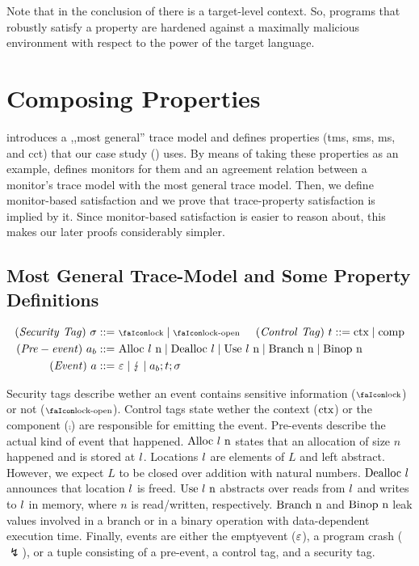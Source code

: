 \documentclass[acmsmall,review,screen,dvipsnames]{acmart}
\begin{document}
Note that in the conclusion of  there is a target-level context.
So, programs that robustly satisfy a property are hardened against a maximally malicious environment with respect to the power of the target language.

\section{Composing Properties}\label{sec:compprop}
 introduces a ,,most general'' trace model and defines properties (\gls{tms}, \gls{sms}, \gls{ms}, and \gls{cct}) that our case study () uses.
By means of taking these properties as an example,  defines monitors for them and an agreement relation between a monitor's trace model with the most general trace model.
Then, we define monitor-based satisfaction and we prove that trace-property satisfaction is implied by it.
Since monitor-based satisfaction is easier to reason about, this makes our later proofs considerably simpler.

\subsection{Most General Trace-Model and Some Property Definitions}\label{subsec:propdefs}

\begin{gather*}
  \begin{aligned}
  \mi{(Security\ Tag)}~\sigma\bnfdef&\ \lock \mid \unlock\hspace{0.5cm}
  \mi{(Control\ Tag)}~\sandboxtag\bnfdef \ctx\mid\comp\\
  \mi{(Pre-event)}~\event[_{b}]\bnfdef&\ \ev{Alloc\ \loc\ n} \mid \ev{Dealloc\ \loc} \mid \ev{Use\ \loc\ n} \mid \ev{Branch\ n} \mid \ev{Binop\ n} \\
  \mi{(Event)}~\event\bnfdef&\ \emptyevent \mid \lightning \mid \event[_{b}];\sandboxtag;\sigma \\
  \end{aligned}
\end{gather*}

Security tags describe wether an event contains sensitive information ($\lock$) or not ($\unlock$).
Control tags state wether the context ($\text{ctx}$) or the component ($\comp$) are responsible for emitting the event.
Pre-events describe the actual kind of event that happened.
$\ev{Alloc\ \loc\ n}$ states that an allocation of size $n$ happened and is stored at $l$.
Locations $l$ are elements of $L$ and left abstract.
However, we expect $L$ to be closed over addition with natural numbers.
$\text{Dealloc\ \ensuremath l}$ announces that location $l$ is freed.
$\text{Use\ \ensuremath l\ n}$ abstracts over reads from $l$ and writes to $l$ in memory, where $n$ is read/written, respectively.
$\ev{Branch\ n}$ and $\text{Binop\ n}$ leak values involved in a branch or in a binary operation with data-dependent execution time.
Finally, events are either the emptyevent ($\varepsilon$), a program crash ($\lightning$), or a tuple consisting of a pre-event, a control tag, and a security tag.
\end{document}
